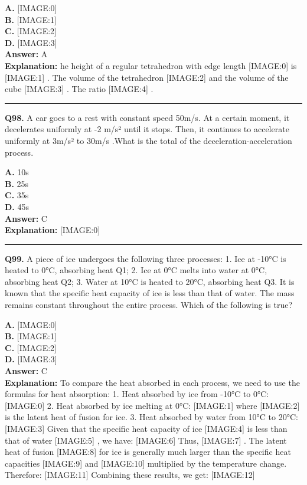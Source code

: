 \documentclass[12pt]{article}
\begin{document}
\textbf{A.} [IMAGE:0] \\
\textbf{B.} [IMAGE:1] \\
\textbf{C.} [IMAGE:2] \\
\textbf{D.} [IMAGE:3] \\

\textbf{Answer:} A \\
\textbf{Explanation:} he height of a regular tetrahedron with edge length
[IMAGE:0]
is
[IMAGE:1]
. The volume of the tetrahedron
[IMAGE:2]
and the volume of the cube
[IMAGE:3]
. The ratio
[IMAGE:4]
.

\hrule
\vspace{1em}


\noindent
\textbf{Q98.} A car goes to a rest with constant speed 50m/s. At a certain moment, it decelerates uniformly at -2 m/s² until it stops. Then, it continues to accelerate uniformly at 3m/s² to 30m/s .What is the total of the deceleration-acceleration process.



\textbf{A.} 10s \\
\textbf{B.} 25s \\
\textbf{C.} 35s \\
\textbf{D.} 45s \\

\textbf{Answer:} C \\
\textbf{Explanation:} [IMAGE:0]

\hrule
\vspace{1em}


\noindent
\textbf{Q99.} A piece of ice undergoes the following three processes:
1.
Ice at -10°C is heated to 0°C, absorbing heat Q1;
2.
Ice at 0°C melts into water at 0°C, absorbing heat Q2;
3.
Water at 10°C is heated to 20°C, absorbing heat Q3.
It is known that the specific heat capacity of ice is less than that of water. The mass remains constant throughout the entire process. Which of the following is true?



\textbf{A.} [IMAGE:0] \\
\textbf{B.} [IMAGE:1] \\
\textbf{C.} [IMAGE:2] \\
\textbf{D.} [IMAGE:3] \\

\textbf{Answer:} C \\
\textbf{Explanation:} To compare the heat absorbed in each process, we need to use the formulas for heat absorption:
1.
Heat absorbed by ice from -10°C to 0°C:
[IMAGE:0]
2.
Heat absorbed by ice melting at 0°C:
[IMAGE:1]
where
[IMAGE:2]
is the latent heat of fusion for ice.
3.
Heat absorbed by water from 10°C to 20°C:
[IMAGE:3]
Given that the specific heat capacity of ice
[IMAGE:4]
is less than that of water
[IMAGE:5]
, we have:
[IMAGE:6]
Thus,
[IMAGE:7]
.
The latent heat of fusion
[IMAGE:8]
for ice is generally much larger than the specific heat capacities
[IMAGE:9]
and
[IMAGE:10]
multiplied by the temperature change. Therefore:
[IMAGE:11]
Combining these results, we get:
[IMAGE:12]
\end{document}
